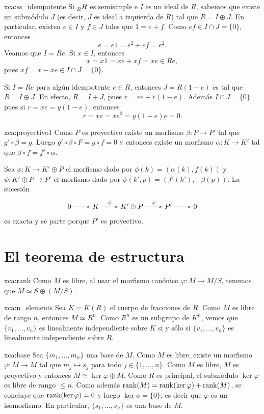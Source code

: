 \begin{sol}{xca:ss_idempotente}
Si $\prescript{}{R}R$ es semisimple e $I$ es un ideal de $R$, sabemos que existe un submódulo $J$ (es decir, $J$ es ideal a izquierda de $R$) tal que $R=I\oplus J$. En particular, 
existen $e\in I$ y $f\in J$ tales que $1=e+f$. Como $ef\in I\cap J=\{0\}$, entonces
\[
e=e1=e^2+ef=e^2.
\]
Veamos que $I=Re$. Si $x\in I$, entonces 
\[
	x=x1=xe+xf=xe\in Re,
\]
pues $xf=x-xe\in I\cap J=\{0\}$. 

Si $I=Re$ para algún idempotente $e\in R$, entonces $J=R(1-e)$ es tal que $R=I\oplus J$. En efecto, $R=I+J$, pues 
$r=re+r(1-e)$. Además $I\cap J=\{0\}$ pues si $r=xe=y(1-e)$, entonces 
\[
r=xe=xe^2=y(1-e)e=0.
\]
\end{sol}


\begin{sol}{xca:proyectivo1}
	Como $P$ es proyectivo existe un morfismo $\beta\colon P\to P'$ tal que $g'\circ \beta=g$.
	Luego $g'\circ \beta\circ F=g\circ f=0$ y entonces existe un morfismo $\alpha\colon K\to K'$
	tal que $\beta\circ f=f'\circ \alpha$. 

	Sea $\phi\colon K\to K'\oplus P$ el morfismo dado por
	$\phi(k)=(\alpha(k),f(k))$ y $\psi\colon K'\oplus P\to P'$ el morfismo dado
	por $\psi(k',p)=(f'(k'),-\beta(p))$. 
	La sucesión 
	\[
	\xymatrix{
	0\ar[r] 
	& K
	\ar[r]^-{\phi}
	& K'\oplus P
	\ar[r]^-{\psi}
	& P'\ar[r]
	& 0
	}
	\]
	es exacta y se parte porque $P'$ es proyectivo.
\end{sol}

\section*{El teorema de estructura}

\begin{sol}{xca:rank}
Como $M$ es libre, al usar el morfismo canónico $\varphi\colon M\to M/S$, tenemos que $M\simeq S\oplus (M/S)$.   
\end{sol}

\begin{sol}{xca:n_elements}
Sea $K=K(R)$ el cuerpo de fracciones de $R$. Como $M$ es libre de rango $n$, entonces $M\simeq R^n$. Como 
$R^n$ es un subgrupo de $K^n$, vemos que $\{v_1,\dots,v_n\}$ es linealmente independiente sobre $K$ si y sólo si $\{v_1,\dots,v_n\}$ 
es linealmente independiente sobre $R$.   
\end{sol}

\begin{sol}{xca:base}
Sea $\{m_1,\dots,m_n\}$ una base de $M$. Como $M$ es libre, existe un morfismo $\varphi\colon M\to M$ tal que $m_j\mapsto s_j$ para todo
$j\in\{1,\dots,n\}$. Como $M$ es libre, $M$ es proyectivo y entonces $M\simeq \ker\varphi\oplus M$. Como $R$ es principal, el submódulo
$\ker\varphi$ es libre de rango $\leq n$. Como además $\operatorname{rank}(M)=\operatorname{rank}(\ker\varphi)+\operatorname{rank}(M)$, se concluye que $\operatorname{rank}(\ker\varphi)=0$ y luego
$\ker\phi=\{0\}$, es decir que $\varphi$ es un isomorfismo. En particular, $\{s_1,\dots,s_n\}$ es una base de $M$.
\end{sol}

